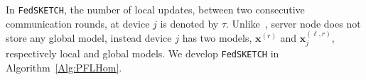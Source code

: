 \documentclass[twoside]{article}
\begin{document}
In \texttt{FedSKETCH}, the number of local updates, between two consecutive communication rounds, at device $j$ is denoted by $\tau$.
 Unlike~\cite{haddadpour2020federated}, server node does not store any global model, instead device $j$ has two models, $\boldsymbol{x}^{(r)}$ and $\boldsymbol{x}^{(\ell,r)}_j$, respectively local and global models. 
%
We develop \texttt{FedSKETCH} in Algorithm~\ref{Alg:PFLHom}. 
\end{document}
